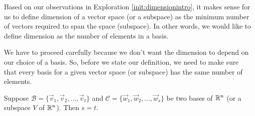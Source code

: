 \documentclass{ximera}
\begin{document}
Based on our observations in Exploration \ref{init:dimensionintro}, it makes sense for us to define dimension of a vector space (or a subspace) as the minimum number of vectors required to span the space (subspace).  In other words, we would like to define dimension as the number of elements in a basis.

We have to proceed carefully because we don't want the dimension to depend on our choice of a basis.  So, before we state our definition, we need to make sure that every basis for a given vector space (or subspace) has the same number of elements.

\begin{theorem}\label{th:dimwelldefined}
Suppose $\mathcal{B}=\{\vec{v}_1, \vec{v}_2,\ldots ,\vec{v}_t\}$ and $\mathcal{C}=\{\vec{w}_1, \vec{w}_2,\ldots ,\vec{w}_s\}$ be two bases of $\mathbb{R}^n$ (or a subspace $V$ of $\mathbb{R}^n$).  Then $s=t$.
\end{theorem}
\end{document}

